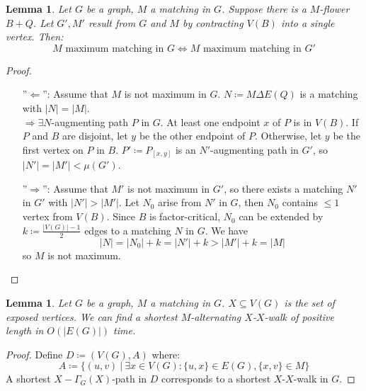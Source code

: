 \documentclass[11pt, a4paper]{article}
\newcommand{\abs}[1]{\left\lvert#1\right\rvert}
\newcommand{\set}[1]{\{#1\}}
\newtheorem{lemma}[theorem]{Lemma}
\theoremstyle{remark}
\theoremstyle{definition}
\begin{document}
\begin{lemma}
Let $G$ be a graph, $M$ a matching in $G$. Suppose there is a $M$-flower
$B+Q$. Let $G',M'$ result from $G$ and $M$ by contracting $V(B)$ into
a single vertex. Then:
\[
	M\text{ maximum matching in $G$} \Leftrightarrow
	M\text{ maximum matching in $G'$}
\]
\end{lemma}
\begin{proof}\ 
\begin{enumerate}
\item[''$\Leftarrow$'':]
Assume that $M$ is not maximum in $G$. $N\coloneqq M\Delta E(Q)$
is a matching with $\abs{N}=\abs{M}$. \\
$\Rightarrow \exists N$-augmenting path $P$ in $G$. At least one endpoint
$x$ of $P$ is in $V(B)$. If $P$ and $B$ are disjoint, let $y$ be the other
endpoint of $P$. Otherwise, let $y$ be the first vertex on $P$ in $B$.
$P'\coloneqq P_{[x,y]}$ is an $N'$-augmenting path in $G'$, so
$\abs{N'}=\abs{M'}<\mu(G')$.

\item[''$\Rightarrow$'':]
Assume that $M'$ is not maximum in $G'$, so there exists a matching $N'$
in $G'$ with $\abs{N'}>\abs{M'}$. Let $N_0$ arise from $N'$ in $G$, then
$N_0$ contains $\leq 1$ vertex from $V(B)$. Since $B$ is factor-critical,
$N_0$ can be extended by $k\coloneqq\frac{\abs{V(G)}-1}{2}$ edges to a
matching $N$ in $G$. We have
\[\abs{N}=\abs{N_0}+k=\abs{N'}+k>\abs{M'}+k=\abs{M}\]
so $M$ is not maximum.
\end{enumerate}
\end{proof}

\begin{lemma}
Let $G$ be a graph, $M$ a matching in $G$. $X\subseteq V(G)$ is the set
of exposed vertices. We can find a shortest $M$-alternating $X$-$X$-walk
of positive length in $O(\abs{E(G)})$ time.
\end{lemma}
\begin{proof}
Define $D\coloneqq (V(G), A)$ where:
\[
	A\coloneqq\set{(u,v)\ |\ \exists
	x\in V(G): \set{u,x}\in E(G), \set{x,v}\in M}
\]
A shortest $X-\Gamma_G(X)$-path in $D$ corresponds to a shortest
$X$-$X$-walk in $G$.
\end{proof}
\end{document}
